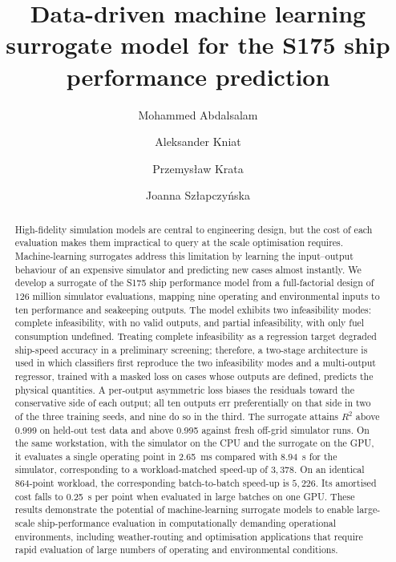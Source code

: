 \documentclass[final,5p,times,twocolumn,numbers]{elsarticle}
\begin{document}
\begin{frontmatter}

\title{Data-driven machine learning surrogate model for the S175 ship performance prediction}

\author[1]{Mohammed Abdalsalam}
\author[2]{Aleksander Kniat}
\author[2]{Przemys{\l}aw Krata}
\author[1]{Joanna Sz{\l}apczy{\'n}ska}


\begin{abstract}
High-fidelity simulation models are central to engineering design, but the cost of each evaluation makes them impractical to query at the scale optimisation requires. Machine-learning surrogates address this limitation by learning the input--output behaviour of an expensive simulator and predicting new cases almost instantly. We develop a surrogate of the S175 ship performance model from a full-factorial design of 126 million simulator evaluations, mapping nine operating and environmental inputs to ten performance and seakeeping outputs. The model exhibits two infeasibility modes: complete infeasibility, with no valid outputs, and partial infeasibility, with only fuel consumption undefined. Treating complete infeasibility as a regression target degraded ship-speed accuracy in a preliminary screening; therefore, a two-stage architecture is used in which classifiers first reproduce the two infeasibility modes and a multi-output regressor, trained with a masked loss on cases whose outputs are defined, predicts the physical quantities. A per-output asymmetric loss biases the residuals toward the conservative side of each output; all ten outputs err preferentially on that side in two of the three training seeds, and nine do so in the third. The surrogate attains $R^2$ above 0.999 on held-out test data and above 0.995 against fresh off-grid simulator runs. On the same workstation, with the simulator on the CPU and the surrogate on the GPU, it evaluates a single operating point in 2.65~ms compared with 8.94~s for the simulator, corresponding to a workload-matched speed-up of $3{,}378$. On an identical 864-point workload, the corresponding batch-to-batch speed-up is $5{,}226$. Its amortised cost falls to 0.25~\textmu s per point when evaluated in large batches on one GPU. These results demonstrate the potential of machine-learning surrogate models to enable large-scale ship-performance evaluation in computationally demanding operational environments, including weather-routing and optimisation applications that require rapid evaluation of large numbers of operating and environmental conditions.
\end{abstract}


\end{frontmatter}
\end{document}
